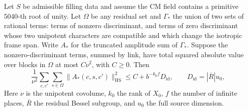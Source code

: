 \begin{lemma}
\label{lem:b-off-link-square}
\emitthmsource
Let $S$ be admissible filling data and assume the CM field contains a primitive $5040$-th root of unity.
Let $\Omega$ be any residual set and $\Gamma_*$ the union of two sets of rational terms:
terms of nonzero discriminant, and terms of zero discriminant whose two unipotent characters are compatible and which change the isotropic frame span.
Write $A_*$ for the truncated amplitude sum of $\Gamma_*$. Suppose the nonzero-discriminant terms, summed by link,
have total squared absolute value over blocks in $\Omega$ at most $C\nu^2$, with $C\ge0$. Then
\[
 \frac1{\nu^2}\sum_{c,c'}\sum_{s\in\Omega}
       \|A_*(c,s,c')\|_{\mathrm{HS}}^2
 \le C+b^{-k_0f} D_{\mathrm{id}},
 \qquad D_{\mathrm{id}}=|\overline R|u_0 ,
\]
Here $\nu$ is the unipotent covolume, $k_0$ the rank of $X_0$, $f$ the number of infinite places,
$\overline R$ the residual Bessel subgroup, and $u_0$ the full source dimension.
\end{lemma}
